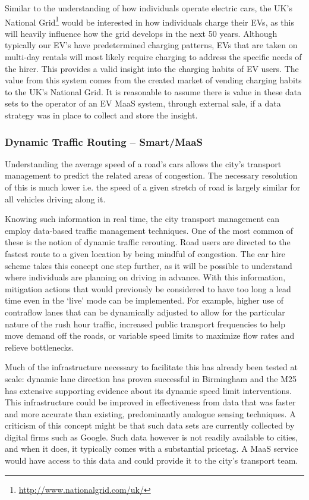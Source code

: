 \documentclass[journal]{IEEEtran}
\begin{document}
Similar to the understanding of how individuals operate electric cars,
the UK’s National Grid\footnote{\url{http://www.nationalgrid.com/uk/}}
would be interested in how individuals charge their EVs, as this will
heavily influence how the grid develops in the next 50 years. Although
typically our EV’s have predetermined charging patterns, EVs that are
taken on multi-day rentals will most likely require charging to
address the specific needs of the hirer. This provides a valid insight
into the charging habits of EV users. The value from this system comes
from the created market of vending charging habits to the UK’s
National Grid. It is reasonable to assume there is value in these data
sets to the operator of an EV MaaS system, through external sale, if a
data strategy was in place to collect and store the insight.

\subsubsection{Dynamic Traffic Routing -- Smart/MaaS} 

Understanding the average speed of a road’s cars allows the city's
transport management to predict the related areas of congestion. The
necessary resolution of this is much lower i.e. the speed of a given
stretch of road is largely similar for all vehicles driving along it. 

Knowing such information in real time, the city transport management
can employ data-based traffic management techniques. One of the most
common of these is the notion of dynamic traffic rerouting. Road users
are directed to the fastest route to a given location by being mindful
of congestion. The car hire scheme takes this concept one step
further, as it will be possible to understand where individuals are
planning on driving in advance. With this information, mitigation
actions that would previously be considered to have too long a lead
time even in the `live' mode can be implemented. For example, higher
use of contraflow lanes that can be dynamically adjusted to allow for
the particular nature of the rush hour traffic, increased public
transport frequencies  to help move demand off the roads, or variable
speed limits to maximize flow rates and relieve bottlenecks.

Much of the infrastructure necessary to facilitate this has already
been tested at scale: dynamic lane direction has proven successful in
Birmingham and the M25 has extensive supporting evidence about its
dynamic speed limit interventions. This infrastructure could be
improved in effectiveness from data that was faster and more accurate
than existing, predominantly analogue sensing techniques.  A criticism
of this concept might be that such data sets are currently collected
by digital firms such as Google. Such data however is not readily
available to cities, and when it does, it typically comes with a
substantial pricetag. A MaaS service would have access to this data
and could provide it to the city’s transport team.
\end{document}
